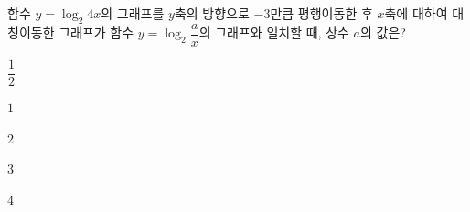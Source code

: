 함수 $y=\log_2 4x$의 그래프를 $y$축의 방향으로 $-3$만큼 평행이동한 후 $x$축에 대하여 대칭이동한 그래프가 함수 $y=\log_2 \dfrac{a}{x}$의 그래프와 일치할 때, 상수 $a$의 값은?
\begin{choices32}{\rule[-3ex]{0pt}{8ex}$\dfrac{1}{2}$}{\rule[-3ex]{0pt}{8ex}$1$}{\rule[-3ex]{0pt}{8ex}$2$}{\rule[-3ex]{0pt}{8ex}$3$}{\rule[-3ex]{0pt}{8ex}$4$}\end{choices32}
